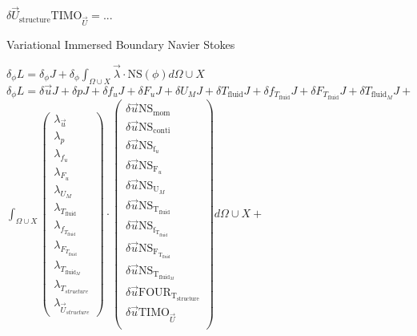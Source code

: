 \documentclass[10pt]{article} %
\begin{document}
\begin{center}
	$\delta \vec{U}_{\text{structure}} \text{TIMO}_{\vec{U}} = ...$\\
\newpage
\begin{flushleft}
	Variational Immersed Boundary Navier Stokes
\end{flushleft}
$\delta_\phi L = \delta_\phi J + \delta_\phi \int_{\Omega \cup X} \vec{\lambda} \cdot \text{NS}(\phi)
	d\Omega\cup X $\\
$\delta_\phi L = \delta \vec{u} J + \delta p J + \delta f_u J + \delta F_u J + \delta U_M J +
	\delta T_{\text{fluid}} J + \delta f_{T_{\text{fluid}}} J + \delta F_{T_{\text{fluid}}} J + \delta T_{\text{fluid}_M} J +$\\
    $\int_{\Omega \cup X}
	\begin{pmatrix}
		\lambda_{\vec{u}} \\ \lambda_p \\ \lambda_{f_u} \\ \lambda_{F_u} \\ \lambda_{U_M}\\ \lambda_{T_{\text{fluid}}} \\ \lambda_{f_{T_{\text{fluid}}}} \\ \lambda_{F_{T_{\text{fluid}}}} \\ \lambda_{T_{\text{fluid}_M}} \\ \lambda_{T_{structure}} \\ \lambda_{\vec{U}_{structure}}
	\end{pmatrix}
	\cdot
	\begin{pmatrix}
		\delta \vec{u} \text{NS}_{\text{mom}} \\
		\delta \vec{u} \text{NS}_{\text{conti}}\\
		\delta \vec{u} \text{NS}_{\text{f}_u} \\
		\delta \vec{u} \text{NS}_{\text{F}_u} \\
		\delta \vec{u} \text{NS}_{\text{U}_M} \\
		\delta \vec{u} \text{NS}_{\text{T}_{\text{fluid}}} \\
		\delta \vec{u} \text{NS}_{\text{f}_{\text{T}_{\text{fluid}}}}\\
		\delta \vec{u} \text{NS}_{\text{F}_{\text{T}_{\text{fluid}}}}\\
		\delta \vec{u} \text{NS}_{\text{T}_{\text{fluid}_M}}\\
		\delta \vec{u} \text{FOUR}_{\text{T}_{\text{structure}}}\\
		\delta \vec{u} \text{TIMO}_{\vec{U}}\\
	\end{pmatrix}
	d\Omega \cup X + $\\


\end{center}
\end{document}
